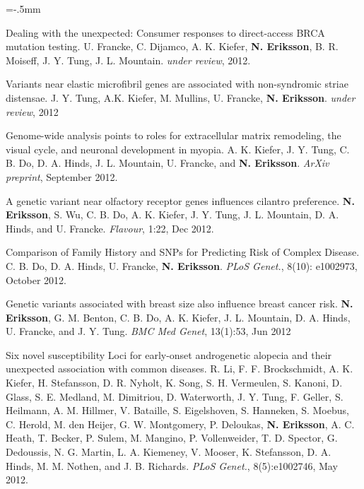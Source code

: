 \documentclass[11pt]{article}
\newenvironment{papers}[1][1]
	{\vspace{-2ex}\leftmargini=16.1mm%
	 \begin{revnumerate}[{#1}]\itemsep=-.5mm}
	{\end{revnumerate}\vspace{-2ex}}
\def\paper{\item}
\def\paperyear#1{\item[\addtocounter{enumi}{-1}%
		 {\makebox[0mm][r]{\makebox[14mm]{#1\hfill\arabic{enumi}.}}}]}
\newcounter{separated}%
\begin{document}
\begin{papers}[25]%

 
                \paperyear{\makebox[5.5ex][r]{submitted\,\,}}
        Dealing with the unexpected: Consumer responses to direct-access BRCA mutation testing.
        U. Francke, C. Dijamco, A. K. Kiefer, \textbf{N. Eriksson}, B. R. Moiseff, J. Y. Tung, J. L. Mountain.
        \textit{under review}, 2012.

            \paper
        Variants near elastic microfibril genes are associated with non-syndromic striae distensae.
        J. Y. Tung, A.K. Kiefer, M. Mullins, U. Francke, \textbf{N. Eriksson}.
        \textit{under review}, 2012

            \paper
        Genome-wide analysis points to roles for extracellular matrix remodeling, the visual cycle, and neuronal development in myopia.
        A. K. Kiefer, J. Y. Tung, C. B. Do, D. A. Hinds, J. L. Mountain, U. Francke, and \textbf{N. Eriksson}.
        \textit{ArXiv preprint}, September 2012.

     
                \paperyear{2012}
        A genetic variant near olfactory receptor genes influences cilantro preference.
        \textbf{N. Eriksson}, S. Wu, C. B. Do, A. K. Kiefer, J. Y. Tung, J. L.  Mountain, D. A. Hinds, and U. Francke.
        \textit{Flavour}, 1:22, Dec 2012.

            \paper
        Comparison of Family History and SNPs for Predicting Risk of Complex Disease.
        C. B. Do, D. A. Hinds, U. Francke, \textbf{N. Eriksson}.
        \textit{PLoS Genet.}, 8(10): e1002973, October 2012.

            \paper
        Genetic variants associated with breast size also influence breast cancer risk.
        \textbf{N. Eriksson}, G. M. Benton, C. B. Do, A. K. Kiefer, J. L. Mountain, D. A. Hinds, U. Francke, and J. Y. Tung.
        \textit{BMC Med Genet}, 13(1):53, Jun 2012

            \paper
        Six novel susceptibility Loci for early-onset androgenetic alopecia and their unexpected association with common diseases.
        R. Li, F. F. Brockschmidt, A. K. Kiefer, H. Stefansson, D. R. Nyholt, K. Song, S. H. Vermeulen, S. Kanoni, D. Glass, S. E. Medland, M. Dimitriou, D. Waterworth, J. Y. Tung, F. Geller, S. Heilmann, A. M. Hillmer, V. Bataille, S. Eigelshoven, S. Hanneken, S. Moebus, C. Herold, M. den Heijer, G. W. Montgomery, P. Deloukas, \textbf{N. Eriksson}, A. C. Heath, T. Becker, P. Sulem, M. Mangino, P. Vollenweider, T. D. Spector, G. Dedoussis, N. G.  Martin, L. A. Kiemeney, V. Mooser, K. Stefansson, D. A. Hinds, M. M. Nothen, and J. B. Richards.
        \textit{PLoS Genet.}, 8(5):e1002746, May 2012.


\end{papers}
\end{document}
